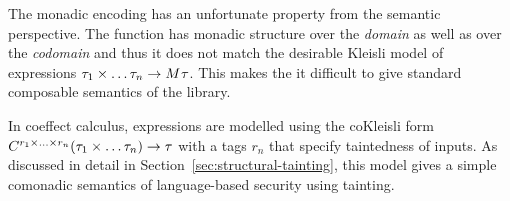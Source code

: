The monadic encoding has an unfortunate property from the semantic perspective. 
The function has monadic structure over the \emph{domain} as well as over the \emph{codomain}
and thus it does not match the desirable Kleisli model of expressions $\tau_1 \times \ldots \tau_n \rightarrow M^{}\tau$. 
This makes the it difficult to give standard composable semantics of the library.

In coeffect calculus, expressions are modelled using the coKleisli form 
$C^{r_1 \times \ldots \times r_n}(\tau_1 \times \ldots \tau_n) \rightarrow \tau$ with a tags 
$r_n$ that specify taintedness of inputs. As discussed in detail in Section~\ref{sec:structural-tainting}, 
this model gives a simple comonadic semantics of language-based security using  tainting.



